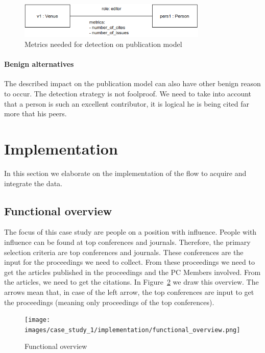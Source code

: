 \documentclass{ou-report}
\begin{document}
\begin{figure}[H]
\centering
\includegraphics[width=9cm]{images/cite_work_editorial_boardmodel_impact.drawio.png}
\caption{Metrics needed for detection on publication model}
\label{fig:cwebimpact}
\end{figure}

\paragraph{Benign alternatives}
The described impact on the publication model can also have other benign reason 
to occur. The detection strategy is not foolproof. We need to take into account 
that a person is such an excellent contributor, it is logical he is being cited
far more that his peers.

\section{Implementation}
In this section we elaborate on the implementation of the flow to acquire and
integrate the data.

\subsection{Functional overview}

The focus of this case study are people on a position with influence.
People with influence can be found at top conferences and journals.
Therefore, the primary selection criteria are top conferences and journals.
These conferences are the input for the proceedings we need to collect. From 
these proceedings we need to get the articles published in the proceedings and
the PC Members involved. From the articles, we need to get the citations.
In Figure~\ref{fig:functional_overview} we draw this overview. The arrows mean
that, in case of the left arrow, the top conferences are input to get the 
proceedings (meaning only proceedings of the top conferences).

\begin{figure}[H]
    \centering
    \texttt{[image: images/case\_study\_1/implementation/functional\_overview.png]}
    \caption{Functional overview}
    \label{fig:functional_overview}
\end{figure}
\end{document}
